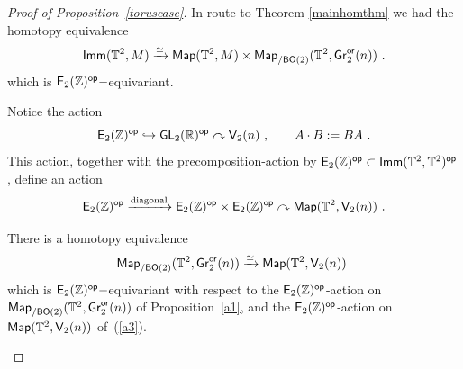 \begin{proof}[Proof of Proposition~\ref{toruscase}]
In route to Theorem \ref{mainhomthm} we had the homotopy equivalence \[
{\sf Imm}(\mathbb T^{2}, M) \xrightarrow{\simeq} {\sf Map}(\mathbb T^{2}, M) \times {\sf Map}_{/{\sf BO}(2)}(\mathbb T^{2}, \operatorname{\sf Gr}_2^{\sf or}(n))~.
\]
which is $\mathsf E_2(\mathbb Z)^{\operatorname{\mathsf{op}}}-$equivariant.

Notice the action 
\begin{equation}
\label{a2}
\mathsf E_2(\mathbb Z)^{\operatorname{\mathsf{op}}} \hookrightarrow \operatorname{\sf GL}_2(\mathbb R)^{\operatorname{\mathsf{op}}}\curvearrowright \mathsf V_2(n) 
~,\qquad
A \cdot B := BA 
~.
\end{equation}
This action, together with the precomposition-action by $\mathsf E_2(\mathbb Z)^{\operatorname{\mathsf{op}}} \subset \operatorname{\sf Imm}(\mathbb T^2,\mathbb T^2)^{\operatorname{\mathsf{op}}}$, define an action
\begin{equation}
\label{a3}
\mathsf E_2(\mathbb Z)^{\operatorname{\mathsf{op}}}
\xrightarrow{\rm diagonal}
\mathsf E_2(\mathbb Z)^{\operatorname{\mathsf{op}}}
\times
\mathsf E_2(\mathbb Z)^{\operatorname{\mathsf{op}}}
\curvearrowright
\operatorname{{\sf Map}}(\mathbb T^2 , \mathsf V_2(n)) 
~.
\end{equation}
\begin{claim} \label{ccccccc}
There is a homotopy equivalence 
\[
{\sf Map}_{/{\sf BO}(2)}(\mathbb T^{2}, \operatorname{\sf Gr}_2^{\sf or}(n)) \xrightarrow{\simeq} {\sf Map}(\mathbb T^{2}, \mathsf V_{2}(n))~
\]
which is $\mathsf E_2(\mathbb Z)^{\operatorname{\mathsf{op}}}-$equivariant with respect to the $\mathsf E_2(\mathbb Z)^{\operatorname{\mathsf{op}}}$-action on ${\sf Map}_{/{\sf BO}(2)}(\mathbb T^{2}, \operatorname{\sf Gr}_2^{\sf or}(n))$ of Proposition~\ref{a1}, and the $\mathsf E_2(\mathbb Z)^{\operatorname{\mathsf{op}}}$-action on ${\sf Map}(\mathbb T^{2}, \mathsf V_{2}(n))$ of~(\ref{a3}).
\end{claim}


\end{proof}
